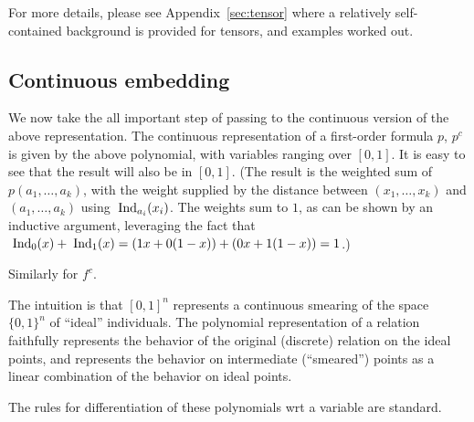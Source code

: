\documentclass{article} %
\begin{document}
For more details, please see Appendix~\ref{sec:tensor} where a relatively self-contained background is provided for tensors, and examples worked out. 

\subsection{Continuous embedding}
We now take the all important step of passing to the continuous version of the above representation. 
The continuous representation of a first-order formula $p$, $p^c$ is given by the above polynomial, with
variables ranging over $[0,1]$. It is easy to see that the result will also be in $[0,1]$. (The result is the weighted sum of $p(a_1, \ldots, 
  a_k)$, with the weight supplied by the distance between $(x_1,
  \ldots, x_k)$ and $(a_1, \ldots, a_k)$ using $\;\mbox{Ind}_{a_i}(x_i)$. The
  weights sum to $1$, as can be shown by an inductive argument,
  leveraging the fact that $\;\mbox{Ind}_{0}(x) + \;\mbox{Ind}_{1}(x)=(1x+0(1-x))+(0x+1(1-x))=1$.)

Similarly for $f^c$. 

The intuition is that $[0,1]^n$ represents a continuous smearing of the space $\{0,1\}^n$ of ``ideal'' individuals. The polynomial representation of a relation faithfully represents the behavior of the original (discrete) relation on the ideal points, and represents the behavior on intermediate (``smeared'') points as a linear combination of the behavior on ideal points.

The rules for differentiation of these polynomials wrt a variable are standard. 
\end{document}
